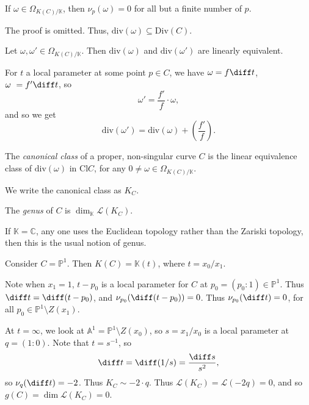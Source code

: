 \documentclass[12pt]{article}
\begin{document}
\begin{proposition}
	If $\omega \in \Omega_{K(C)/\mathbb{K}}$, then $\nu_p(\omega) = 0$ for all but a finite number of $p$.
\end{proposition}

The proof is omitted. Thus, $\mathrm{div}(\omega) \subseteq \mathrm{Div}(C)$.


\begin{proposition}
	Let $\omega, \omega' \in \Omega_{K(C)/\mathbb{K}}$. Then $\mathrm{div}(\omega)$ and $\mathrm{div}(\omega')$ are linearly equivalent.
\end{proposition}

\begin{proofbox}
	For $t$ a local parameter at some point $p \in C$, we have $\omega = f \diff t$, $\omega\ = f' \diff t$, so
	\[
	\omega' = \frac{f'}{f} \cdot \omega,
	\]
	and so we get
	\[
	\mathrm{div}(\omega') = \mathrm{div}(\omega) + \left( \frac{f'}{f} \right).
	\]
\end{proofbox}

\begin{definition}
	The \emph{canonical class} of a proper, non-singular curve $C$ is the linear equivalence class of $\mathrm{div}(\omega)$ in $\mathrm{Cl} C$, for any $0 \neq \omega \in \Omega_{K(C)/\mathbb{K}}$.

	We write the canonical class as $K_C$.
\end{definition}

\begin{definition}
	The \emph{genus} of $C$ is $\dim_{\mathbb{K}} \mathcal{L}(K_C)$.
\end{definition}

If $\mathbb{K} = \mathbb{C}$, any one uses the Euclidean topology rather than the Zariski topology, then this is the usual notion of genus.

\begin{exbox}
	Consider $C = \mathbb{P}^1$. Then $K(C) = \mathbb{K}(t)$, where $t = x_0/x_1$.

	Note when $x_1 = 1$, $t - p_0$ is a local parameter for $C$ at $p_0 = (p_0 : 1) \in \mathbb{P}^1$. Thus $\diff t  = \diff (t - p_0)$, and $\nu_{p_0}(\diff (t - p_0)) = 0$. Thus $\nu_{p_0}(\diff t) = 0$, for all $p_0 \in \mathbb{P}^1 \setminus Z(x_1)$.

	At $t = \infty$, we look at $\mathbb{A}^1 = \mathbb{P}^1 \setminus Z(x_0)$, so $s = x_1/x_0$ is a local parameter at $q = (1 : 0)$. Note that $t = s^{-1}$, so
	\[
	\diff t = \diff(1/s) = \frac{\diff s}{s^2},
	\]
	so $\nu_q( \diff t) = -2$. Thus $K_C \sim -2 \cdot q$. Thus $\mathcal{L}(K_C) = \mathcal{L}(-2 q) = 0$, and so $g(C) = \dim \mathcal{L}(K_C) = 0$.
\end{exbox}
\end{document}
